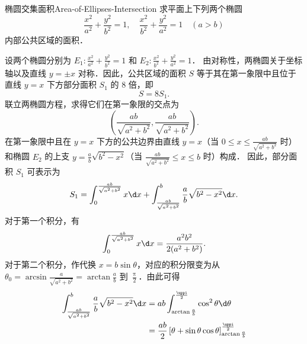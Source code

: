 \begin{problem}{椭圆交集面积}{Area-of-Ellipses-Intersection}
    求平面上下列两个椭圆
    \begin{equation*}
        \frac{x^2}{a^2} + \frac{y^2}{b^2} = 1, \quad \frac{x^2}{b^2} + \frac{y^2}{a^2} = 1 \quad (a > b)
    \end{equation*}
    内部公共区域的面积．
\end{problem}

\begin{solution}
    设两个椭圆分别为 $E_1: \frac{x^2}{a^2} + \frac{y^2}{b^2} = 1$ 和 $E_2: \frac{x^2}{b^2} + \frac{y^2}{a^2} = 1$．
    由对称性，两椭圆关于坐标轴以及直线 $y = \pm x$ 对称．因此，公共区域的面积 $S$ 等于其在第一象限中且位于直线 $y = x$ 下方部分面积 $S_1$ 的 $8$ 倍，即
    \begin{equation}
        \label{eq:total-area}
        S = 8 S_1.
    \end{equation}
    联立两椭圆方程，求得它们在第一象限的交点为
    \begin{equation}
        \label{eq:intersection}
        \left( \frac{ab}{\sqrt{a^2 + b^2}}, \frac{ab}{\sqrt{a^2 + b^2}} \right).
    \end{equation}
    在第一象限中且在 $y = x$ 下方的公共边界由直线 $y = x$（当 $0 \le x \le \frac{ab}{\sqrt{a^2+b^2}}$ 时）和椭圆 $E_2$ 的上支 $y = \frac{a}{b}\sqrt{b^2 - x^2}$（当 $\frac{ab}{\sqrt{a^2+b^2}} \le x \le b$ 时）构成．
    因此，部分面积 $S_1$ 可表示为
    \begin{equation}
        \label{eq:s1-integral}
        S_1 = \int_{0}^{\frac{ab}{\sqrt{a^2+b^2}}} x \d x + \int_{\frac{ab}{\sqrt{a^2+b^2}}}^{b} \frac{a}{b}\sqrt{b^2 - x^2} \d x.
    \end{equation}
    对于第一个积分，有
    \begin{equation}
        \label{eq:part1}
        \int_{0}^{\frac{ab}{\sqrt{a^2+b^2}}} x \d x = \frac{a^2 b^2}{2(a^2 + b^2)}.
    \end{equation}
    对于第二个积分，作代换 $x = b \sin \theta$，对应的积分限变为从 $\theta_0 = \arcsin \frac{a}{\sqrt{a^2+b^2}} = \arctan \frac{a}{b}$ 到 $\frac{\uppi}{2}$．由此可得
    \begin{equation}
        \label{eq:part2}
        \begin{aligned}
            \int_{\frac{ab}{\sqrt{a^2+b^2}}}^{b} \frac{a}{b}\sqrt{b^2 - x^2} \d x & = ab \int_{\arctan \frac{a}{b}}^{\frac{\uppi}{2}} \cos^2 \theta \d \theta                              \\
                                                                                  & = \frac{ab}{2} \left[ \theta + \sin \theta \cos \theta \right]_{\arctan \frac{a}{b}}^{\frac{\uppi}{2}} \\

\end{aligned}
\end{equation}
\end{solution}
